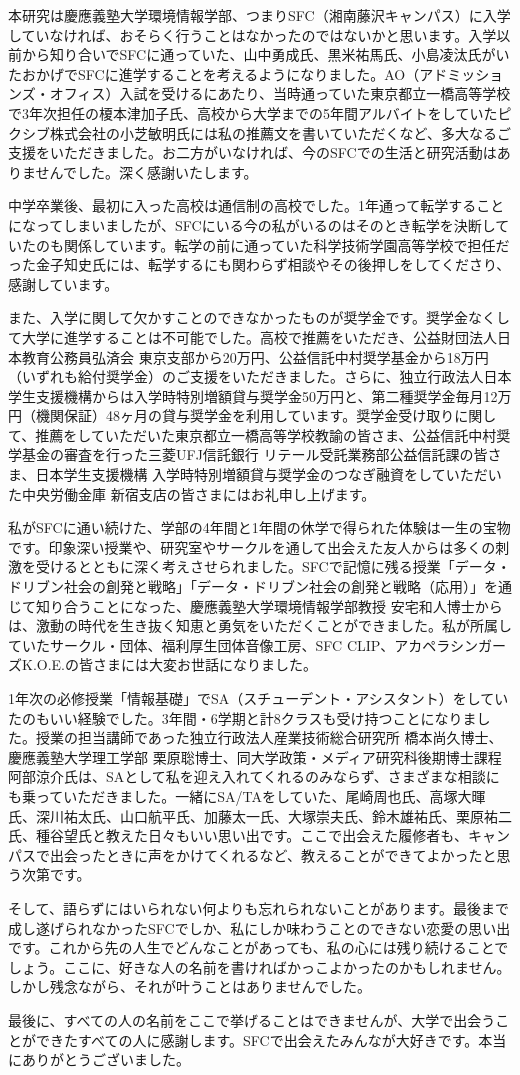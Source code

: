 本研究は慶應義塾大学環境情報学部、つまりSFC（湘南藤沢キャンパス）に入学していなければ、おそらく行うことはなかったのではないかと思います。入学以前から知り合いでSFCに通っていた、山中勇成氏、黒米祐馬氏、小島凌汰氏がいたおかげでSFCに進学することを考えるようになりました。AO（アドミッションズ・オフィス）入試を受けるにあたり、当時通っていた東京都立一橋高等学校で3年次担任の榎本津加子氏、高校から大学までの5年間アルバイトをしていたピクシブ株式会社の小芝敏明氏には私の推薦文を書いていただくなど、多大なるご支援をいただきました。お二方がいなければ、今のSFCでの生活と研究活動はありませんでした。深く感謝いたします。

中学卒業後、最初に入った高校は通信制の高校でした。1年通って転学することになってしまいましたが、SFCにいる今の私がいるのはそのとき転学を決断していたのも関係しています。転学の前に通っていた科学技術学園高等学校で担任だった金子知史氏には、転学するにも関わらず相談やその後押しをしてくださり、感謝しています。

また、入学に関して欠かすことのできなかったものが奨学金です。奨学金なくして大学に進学することは不可能でした。高校で推薦をいただき、公益財団法人日本教育公務員弘済会 東京支部から20万円、公益信託中村奨学基金から18万円（いずれも給付奨学金）のご支援をいただきました。さらに、独立行政法人日本学生支援機構からは入学時特別増額貸与奨学金50万円と、第二種奨学金毎月12万円（機関保証）48ヶ月の貸与奨学金を利用しています。奨学金受け取りに関して、推薦をしていただいた東京都立一橋高等学校教諭の皆さま、公益信託中村奨学基金の審査を行った三菱UFJ信託銀行 リテール受託業務部公益信託課の皆さま、日本学生支援機構 入学時特別増額貸与奨学金のつなぎ融資をしていただいた中央労働金庫 新宿支店の皆さまにはお礼申し上げます。

私がSFCに通い続けた、学部の4年間と1年間の休学で得られた体験は一生の宝物です。印象深い授業や、研究室やサークルを通して出会えた友人からは多くの刺激を受けるとともに深く考えさせられました。SFCで記憶に残る授業「データ・ドリブン社会の創発と戦略」「データ・ドリブン社会の創発と戦略（応用）」を通じて知り合うことになった、慶應義塾大学環境情報学部教授 安宅和人博士からは、激動の時代を生き抜く知恵と勇気をいただくことができました。私が所属していたサークル・団体、福利厚生団体音像工房、SFC CLIP、アカペラシンガーズK.O.E.の皆さまには大変お世話になりました。

1年次の必修授業「情報基礎」でSA（スチューデント・アシスタント）をしていたのもいい経験でした。3年間・6学期と計8クラスも受け持つことになりました。授業の担当講師であった独立行政法人産業技術総合研究所 橋本尚久博士、慶應義塾大学理工学部 栗原聡博士、同大学政策・メディア研究科後期博士課程 阿部涼介氏は、SAとして私を迎え入れてくれるのみならず、さまざまな相談にも乗っていただきました。一緒にSA/TAをしていた、尾崎周也氏、高塚大暉氏、深川祐太氏、山口航平氏、加藤太一氏、大塚崇夫氏、鈴木雄祐氏、栗原祐二氏、種谷望氏と教えた日々もいい思い出です。ここで出会えた履修者も、キャンパスで出会ったときに声をかけてくれるなど、教えることができてよかったと思う次第です。

そして、語らずにはいられない何よりも忘れられないことがあります。最後まで成し遂げられなかったSFCでしか、私にしか味わうことのできない恋愛の思い出です。これから先の人生でどんなことがあっても、私の心には残り続けることでしょう。ここに、好きな人の名前を書ければかっこよかったのかもしれません。しかし残念ながら、それが叶うことはありませんでした。

\newpage

最後に、すべての人の名前をここで挙げることはできませんが、大学で出会うことができたすべての人に感謝します。SFCで出会えたみんなが大好きです。本当にありがとうございました。
